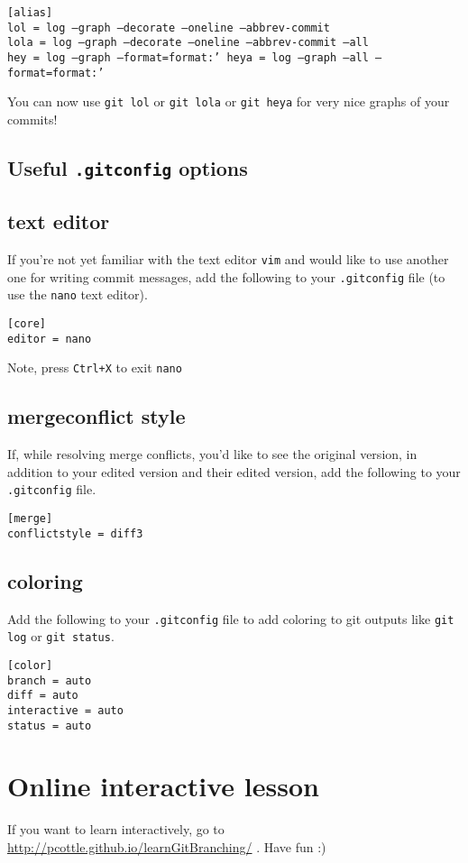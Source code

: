 \documentclass[12pt]{article}
\begin{document}
\texttt{[alias]\\
lol = log --graph --decorate --oneline --abbrev-commit\\
lola = log --graph --decorate --oneline --abbrev-commit --all\\
hey = log --graph --format=format:'%
heya = log --graph --all --format=format:'%
}

You can now use \texttt{git lol} or \texttt{git lola} or \texttt{git heya} for very nice graphs of your commits!

\subsection{Useful \texttt{.gitconfig} options}

\subsection{text editor}
If you're not yet familiar with the text editor \texttt{vim} and would like to use another one for writing commit messages, add the following to your \texttt{.gitconfig} file (to use the \texttt{nano} text editor).

\texttt{[core]\\
editor = nano }

Note, press \texttt{Ctrl+X} to exit \texttt{nano}

\subsection{mergeconflict style}
If, while resolving merge conflicts, you'd like to see the original version, in addition to your edited version and their edited version, add the following to your \texttt{.gitconfig} file.

\texttt{[merge]\\
conflictstyle = diff3 }

\subsection{coloring}
Add the following to your \texttt{.gitconfig} file to add coloring to git outputs like \texttt{git log} or \texttt{git status}.

\texttt{[color]\\
  branch = auto\\
  diff = auto\\
  interactive = auto\\
  status = auto }

\section{Online interactive lesson}
If you want to learn interactively, go to \url{http://pcottle.github.io/learnGitBranching/} . Have fun :)
\end{document}
